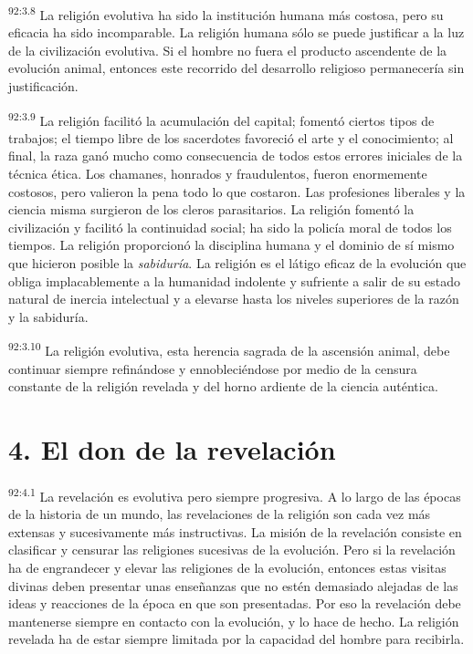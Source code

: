 \documentclass[twoside, 11pt]{book}
\begin{document}
\par
\textsuperscript{92:3.8} La religión evolutiva ha sido la institución humana más costosa, pero su eficacia ha sido incomparable. La religión humana sólo se puede justificar a la luz de la civilización evolutiva. Si el hombre no fuera el producto ascendente de la evolución animal, entonces este recorrido del desarrollo religioso permanecería sin justificación.

\par
\textsuperscript{92:3.9} La religión facilitó la acumulación del capital; fomentó ciertos tipos de trabajos; el tiempo libre de los sacerdotes favoreció el arte y el conocimiento; al final, la raza ganó mucho como consecuencia de todos estos errores iniciales de la técnica ética. Los chamanes, honrados y fraudulentos, fueron enormemente costosos, pero valieron la pena todo lo que costaron. Las profesiones liberales y la ciencia misma surgieron de los cleros parasitarios. La religión fomentó la civilización y facilitó la continuidad social; ha sido la policía moral de todos los tiempos. La religión proporcionó la disciplina humana y el dominio de sí mismo que hicieron posible la \textit{sabiduría}. La religión es el látigo eficaz de la evolución que obliga implacablemente a la humanidad indolente y sufriente a salir de su estado natural de inercia intelectual y a elevarse hasta los niveles superiores de la razón y la sabiduría.

\par
\textsuperscript{92:3.10} La religión evolutiva, esta herencia sagrada de la ascensión animal, debe continuar siempre refinándose y ennobleciéndose por medio de la censura constante de la religión revelada y del horno ardiente de la ciencia auténtica.

\section*{4. El don de la revelación}
\par
\textsuperscript{92:4.1} La revelación es evolutiva pero siempre progresiva. A lo largo de las épocas de la historia de un mundo, las revelaciones de la religión son cada vez más extensas y sucesivamente más instructivas. La misión de la revelación consiste en clasificar y censurar las religiones sucesivas de la evolución. Pero si la revelación ha de engrandecer y elevar las religiones de la evolución, entonces estas visitas divinas deben presentar unas enseñanzas que no estén demasiado alejadas de las ideas y reacciones de la época en que son presentadas. Por eso la revelación debe mantenerse siempre en contacto con la evolución, y lo hace de hecho. La religión revelada ha de estar siempre limitada por la capacidad del hombre para recibirla.
\end{document}
